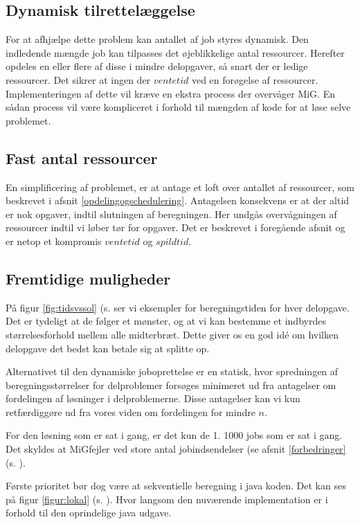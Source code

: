 \documentclass[final,a4paper,11pt]{article}
\newcommand{\mig}{MiG}
\begin{document}
\subsection{Dynamisk tilrettelæggelse}

For at afhjælpe dette problem kan antallet af job styres dynamisk. Den indledende mængde job kan tilpasses det øjeblikkelige antal ressourcer. Herefter opdeles en eller flere af disse i mindre delopgaver, så snart der er ledige ressourcer.  Det sikrer at ingen der $ventetid$ ved en forøgelse af ressourcer. Implementeringen af dette vil kræve en ekstra process der overvåger \mig. En sådan process vil være kompliceret i forhold til mængden af kode for at løse selve problemet.

\subsection{Fast antal ressourcer}

En simplificering af problemet, er at antage et loft over antallet af ressourcer, som beskrevet i afsnit \ref{opdelingogschedulering}. Antagelsen konsekvens er at der altid er nok opgaver, indtil slutningen af beregningen.  Her undgås overvågningen af ressourcer indtil vi løber tør for opgaver. Det er beskrevet i foregående afsnit og er netop et kompromis $ventetid$ og $spildtid$.

\subsection{Fremtidige muligheder}

På figur \ref{fig:tidsvssol} (s. \pageref{fig:tidsvssol} ser vi eksempler for beregningstiden for hver delopgave. Det er tydeligt at de følger et mønster, og at vi kan bestemme et indbyrdes størrelsesforhold mellem alle midterbræt. Dette giver os en god idé om hvilken delopgave det bedst kan betale sig at splitte op.

Alternativet til den dynamiske joboprettelse er en statisk, hvor spredningen af beregningsstørrelser for delproblemer forsøges minimeret ud fra antagelser om fordelingen af løsninger i delproblemerne. Disse antagelser kan vi kun retfærdiggøre ud fra vores viden om fordelingen for mindre $n$. 

For den løsning som er sat i gang, er det kun de 1. 1000 jobs som er sat i gang. Det skyldes at \mig  fejler ved store antal jobindsendelser (se afsnit \ref{forbedringer} (s. \pageref{forbedringer}). 

Første prioritet bør dog være at sekventielle beregning i java koden. Det kan ses på figur \ref{figur:lokal} (s. \pageref{figur:lokal}). Hvor langsom den nuværende implementation er i forhold til den oprindelige java udgave.
   
\end{document}
